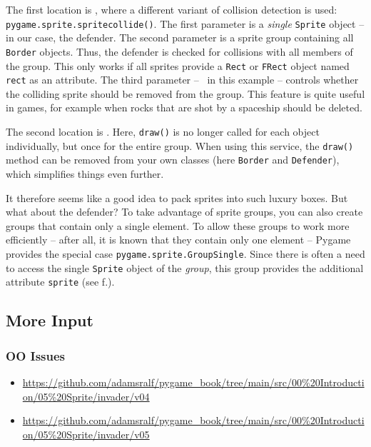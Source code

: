 The first location is , where a different variant of collision detection is used: \texttt{pygame.sprite.spritecollide()}. The first parameter is a \emph{single} \texttt{Sprite} object -- in our case, the defender. The second parameter is a sprite group containing all \texttt{Border} objects. Thus, the defender is checked for collisions with all members of the group. This only works if all sprites provide a \texttt{Rect} or \texttt{FRect} object named \texttt{rect} as an attribute. The third parameter -- \false\ in this example -- controls whether the colliding sprite should be removed from the group. This feature is quite useful in games, for example when rocks that are shot by a spaceship should be deleted.

The second location is . Here, \texttt{draw()} is no longer called for each object individually, but once for the entire group. When using this service, the \texttt{draw()} method can be removed from your own classes (here \texttt{Border} and \texttt{Defender}), which simplifies things even further.

It therefore seems like a good idea to pack sprites into such luxury boxes. But what about the defender? To take advantage of sprite groups, you can also create groups that contain only a single element. To allow these groups to work more efficiently -- after all, it is known that they contain only one element -- Pygame provides the special case \texttt{pygame.sprite.GroupSingle}. Since there is often a need to access the single \texttt{Sprite} object of the \emph{group}, this group provides the additional attribute \texttt{sprite} (see f.).

\subsection{More Input}
\subsubsection{OO Issues}
\begin{diskbox}
	\begin{itemize}
		\item \url{https://github.com/adamsralf/pygame_book/tree/main/src/00%20Introduction/05%20Sprite/invader/v04}
		\item \url{https://github.com/adamsralf/pygame_book/tree/main/src/00%20Introduction/05%20Sprite/invader/v05}
	\end{itemize}
\end{diskbox}

